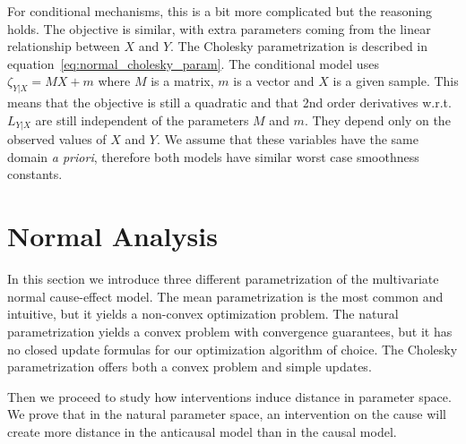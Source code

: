 \begin{subappendices}
For conditional mechanisms, this is a bit more complicated but the reasoning holds.
The objective is similar, with extra parameters coming from the linear relationship between $X$ and $Y$. 
The Cholesky parametrization is described in equation~\eqref{eq:normal_cholesky_param}.
The conditional model uses $\zeta_{Y|X} = MX + m$ where $M$ is a matrix, $m$ is a vector and $X$ is a given sample.
This means that the objective is still a quadratic and that 2nd order derivatives w.r.t. $L_{Y|X}$ are still    independent of the parameters $M$ and $m$.
They depend only on the observed values of $X$ and $Y$.
We assume that these variables have the same domain \textit{a priori}, therefore both models have similar worst case smoothness constants.


\section{{Normal Analysis}}
\label{apdx:normal_analysis}
In this section we introduce three different parametrization of the multivariate normal cause-effect model. 
The mean parametrization is the most common and intuitive, but it yields a non-convex optimization problem. 
The natural parametrization yields a convex problem with convergence guarantees, but it has no closed update formulas for our optimization algorithm of choice. 
The Cholesky parametrization offers both a convex problem and simple updates. 

Then we proceed to study how interventions induce distance in parameter space. We prove that in the natural parameter space, an intervention on the cause will create more distance in the anticausal model than in the causal model.



\end{subappendices}
